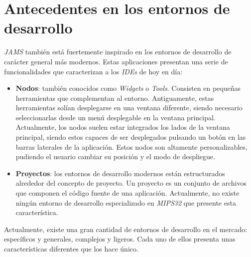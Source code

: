 \section{Antecedentes en los entornos de desarrollo}
\label{sec:antecedentes-en-los-entornos-de-desarrollo}

\textit{JAMS} también está fuertemente inspirado en los
entornos de desarrollo de carácter general más modernos.
Estas aplicaciones presentan una serie de funcionalidades que
caracterizan a los \textit{IDEs} de hoy en día:

\begin{itemize}
    \item \textbf{Nodos}: también conocidos como \textit{Widgets} o \textit{Tools}.
    Consisten en pequeñas herramientas que complementan al entorno.
    Antiguamente, estas herramientas solían desplegarse en una ventana diferente,
    siendo necesario seleccionarlas desde un menú desplegable en la ventana principal.
    Actualmente, los nodos suelen estar integrados  los lados de la ventana principal,
    siendo estos capaces de ser desplegados pulsando un botón en las barras laterales
    de la aplicación.
    Estos nodos son altamente personalizables, pudiendo el usuario cambiar su posición
    y el modo de despliegue.
    \item \textbf{Proyectos}: los entornos de desarrollo modernos están estructurados
    alrededor del concepto de proyecto.
    Un proyecto es un conjunto de archivos que componen el código fuente de una aplicación.
    Actualmente, no existe ningún entorno de desarrollo especializado en \textit{MIPS32}
    que presente esta característica.
\end{itemize}

Actualmente, existe una gran cantidad de entornos de desarrollo en el mercado:
específicos y generales, complejos y ligeros.
Cada uno de ellos presenta unas características diferentes que los hace único.

